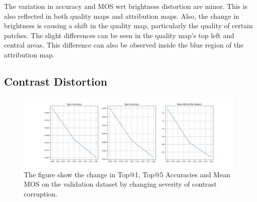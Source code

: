 \documentclass[10pt,twocolumn,letterpaper]{article}
\begin{document}
The variation in accuracy and MOS wrt brightness distortion are minor. This is also reflected in both quality maps and attribution maps. Also, the change in brightness is causing a shift in the quality map, particularly the quality of certain patches. The slight differences can be seen in the quality map's top left and central areas. This difference can also be observed inside the blue region of the attribution map.

\subsection{Contrast Distortion}
\begin{figure}[!ht]
	\centering
	\includegraphics[width=1.\columnwidth]{Images/contrast.png}
	\caption{The figure show the change in Top@1, Top@5 Accuracies and Mean MOS on the validation dataset by changing severity of contrast corruption.}
\end{figure}
\end{document}
